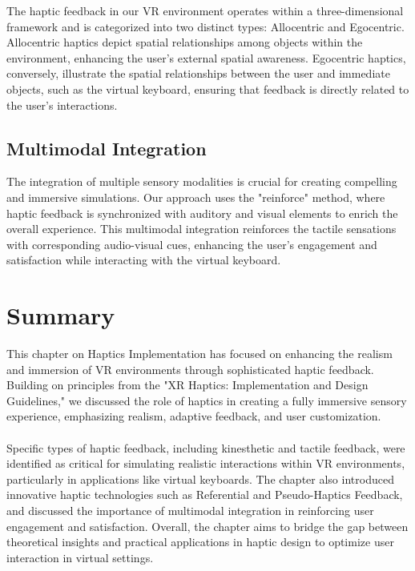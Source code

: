 The haptic feedback in our \ac{VR} environment operates within a three-dimensional framework and is categorized into two distinct types: Allocentric and Egocentric. Allocentric haptics depict spatial relationships among objects within the environment, enhancing the user's external spatial awareness. Egocentric haptics, conversely, illustrate the spatial relationships between the user and immediate objects, such as the virtual keyboard, ensuring that feedback is directly related to the user's interactions.

\subsection{Multimodal Integration}
\label{sec:MultimodalIntegration}

The integration of multiple sensory modalities is crucial for creating compelling and immersive simulations. Our approach uses the "reinforce" method, where haptic feedback is synchronized with auditory and visual elements to enrich the overall experience. This multimodal integration reinforces the tactile sensations with corresponding audio-visual cues, enhancing the user's engagement and satisfaction while interacting with the virtual keyboard.
\section{Summary}
\label{sec:Summary}

This chapter on Haptics Implementation has focused on enhancing the realism and immersion of \ac{VR} environments through sophisticated haptic feedback. Building on principles from the "XR Haptics: Implementation and Design Guidelines," we discussed the role of haptics in creating a fully immersive sensory experience, emphasizing realism, adaptive feedback, and user customization.\\ \\
Specific types of haptic feedback, including kinesthetic and tactile feedback, were identified as critical for simulating realistic interactions within \ac{VR} environments, particularly in applications like virtual keyboards. The chapter also introduced innovative haptic technologies such as Referential and Pseudo-Haptics Feedback, and discussed the importance of multimodal integration in reinforcing user engagement and satisfaction. Overall, the chapter aims to bridge the gap between theoretical insights and practical applications in haptic design to optimize user interaction in virtual settings.
